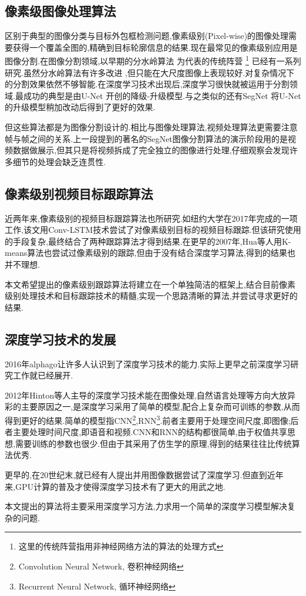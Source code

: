 \subsection{像素级图像处理算法}
区别于典型的图像分类与目标外包框检测问题,像素级别(Pixel-wise)的图像处理需要获得一个覆盖全图的,精确到目标轮廓信息的结果.现在最常见的像素级别应用是图像分割.在图像分割领域,以早期的分水岭算法
\supercite{olsen1997multi}
为代表的传统阵营
\footnote{这里的传统阵营指用非神经网络方法的算法的处理方式}
已经有一系列研究.虽然分水岭算法有许多改进
\supercite{grau2004improved}
,但只能在大尺度图像上表现较好.对复杂情况下的分割效果依然不够智能.在深度学习技术出现后,深度学习很快就被运用于分割领域.最成功的典型是由U-Net
\supercite{ronneberger2015u}
开创的降级-升级模型.与之类似的还有SegNet
\supercite{badrinarayanan2017segnet}
将U-Net的升级模型稍加改动后得到了更好的效果.
\par
但这些算法都是为图像分割设计的.相比与图像处理算法,视频处理算法更需要注意帧与帧之间的关系.上一段提到的著名的SegNet图像分割算法的演示阶段用的是视频数据做展示,但其只是将视频拆成了完全独立的图像进行处理,仔细观察会发现许多细节的处理会缺乏连贯性.

\subsection{像素级别视频目标跟踪算法}
近两年来,像素级别的视频目标跟踪算法也所研究.如纽约大学在2017年完成的一项工作\supercite{DBLP:journals/corr/abs-1711-07377},该文用Conv-LSTM技术\supercite{PatrauceanHC16}尝试了对像素级别目标的视频目标跟踪.但该研究使用的手段复杂,最终结合了两种跟踪算法才得到结果.在更早的2007年,Hua等人用K-means算法也尝试过像素级别的跟踪\supercite{hua2008k},但由于没有结合深度学习算法,得到的结果也并不理想.
\par
本文希望提出的像素级别跟踪算法将建立在一个单独简洁的框架上,结合目前像素级别处理技术和目标跟踪技术的精髓,实现一个思路清晰的算法,并尝试寻求更好的结果.

\subsection{深度学习技术的发展}
2016年alphago\supercite{wang2016does}让许多人认识到了深度学习技术的能力.实际上更早之前深度学习研究工作就已经展开.
\par
2012年Hinton等人主导的深度学习技术能在图像处理,自然语言处理等方向大放异彩的主要原因之一,是深度学习采用了简单的模型,配合上复杂而可训练的参数,从而得到更好的结果.简单的模型指CNN\footnote{Convolution Neural Network, 卷积神经网络},RNN\footnote{Recurrent Neural Network, 循环神经网络}.前者主要用于处理空间尺度,即图像;后者主要处理时间尺度,即语音和视频.CNN和RNN的结构都很简单,由于权值共享思想,需要训练的参数也很少.但由于其采用了仿生学的原理,得到的结果往往比传统算法优秀.
\par
更早的,在20世纪末,就已经有人提出并用图像数据尝试了深度学习\supercite{lecun1998gradient}.但直到近年来,GPU计算的普及才使得深度学习技术有了更大的用武之地.
\par
本文提出的算法将主要采用深度学习方法,力求用一个简单的深度学习模型解决复杂的问题.

